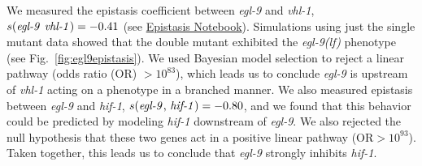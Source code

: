 \documentclass[9pt,twocolumn,twoside]{pnas-new}
\newcommand{\gene}[1]{\mbox{\emph{#1}}}
\newcommand{\egl}{\gene{egl-9(lf)}}
\begin{document}
We measured the epistasis coefficient between \gene{egl-9} and \gene{vhl-1},
$s({\text{\gene{egl-9} \gene{vhl-1}}}) = -0.41$ (see
\href{https://wormlabcaltech.github.io/mprsq/analysis_notebooks/6_epistasis.html}
{Epistasis Notebook}). Simulations using just the
single mutant data showed that the double mutant exhibited the \egl{} phenotype
(see Fig.~\ref{fig:egl9epistasis}). We used Bayesian model selection to reject a
linear pathway (odds ratio (OR) $>10^{83}$), which leads us to conclude
\gene{egl-9} is upstream of \gene{vhl-1} acting on a phenotype in a branched
manner. We also measured epistasis between \gene{egl-9} and \gene{hif-1},
$s({\text{\gene{egl-9}, \gene{hif-1}}}) = -0.80$, and we found that this
behavior could be predicted by modeling \gene{hif-1} downstream of \gene{egl-9}.
We also rejected the null hypothesis that these two genes act in a positive
linear pathway (OR$> 10^{93}$). Taken together, this leads us to conclude that
\gene{egl-9} strongly inhibits \gene{hif-1}.
\end{document}
